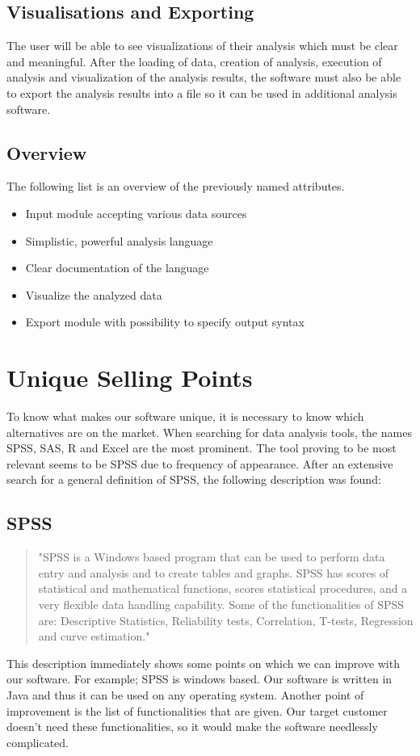 \documentclass[a4paper]{article}
\begin{document}
\subsection{Visualisations and Exporting}
The user will be able to see visualizations of their analysis which must be clear and meaningful. After the loading of data, creation of analysis, execution of analysis and visualization of the analysis results, the software must also be able to export the analysis results into a file so it can be used in additional analysis software. 

\subsection{Overview}
The following list is an overview of the previously named attributes.
\begin{itemize}
\item Input module accepting various data sources
\item Simplistic, powerful analysis language
\item Clear documentation of the language
\item Visualize the analyzed data
\item Export module with possibility to specify output syntax
\end{itemize}

\section{Unique Selling Points}
To know what makes our software unique, it is necessary to know which alternatives are on the market. When searching for data analysis tools, the names SPSS, SAS, R and Excel are the most prominent. The tool proving to be most relevant seems to be SPSS due to frequency of appearance. After an extensive search for a general definition of SPSS, the following description was found: 
\subsection{SPSS}
\begin{quotation}
"SPSS is a Windows based program that can be used to perform data entry and analysis
and to create tables and graphs. SPSS has scores of statistical and mathematical functions,
scores statistical procedures, and a very flexible data handling capability. Some of the
functionalities of SPSS are: Descriptive Statistics, Reliability tests, Correlation, T-tests,
Regression and curve estimation." \cite{SPSS}
\end{quotation}
\par
This description immediately shows some points on which we can improve with our software. For example; SPSS is windows based. Our software is written in Java and thus it can be used on any operating system. Another point of improvement is the list of functionalities that are given. Our target customer doesn't need these functionalities, so it would make the software needlessly complicated.
\end{document}
